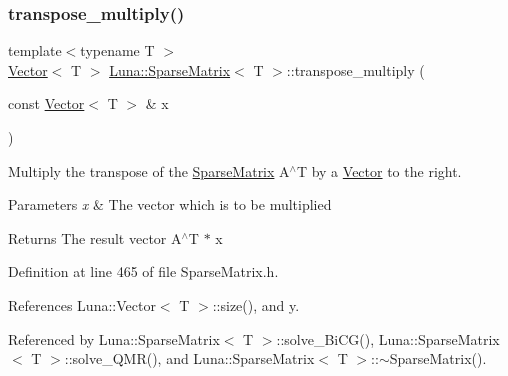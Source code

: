 \subsubsection{\texorpdfstring{transpose\+\_\+multiply()}{transpose\_multiply()}}
{\footnotesize\ttfamily template$<$typename T $>$ \\
\hyperlink{classLuna_1_1Vector}{Vector}$<$ T $>$ \hyperlink{classLuna_1_1SparseMatrix}{Luna\+::\+Sparse\+Matrix}$<$ T $>$\+::transpose\+\_\+multiply (\begin{DoxyParamCaption}\item[{const \hyperlink{classLuna_1_1Vector}{Vector}$<$ T $>$ \&}]{x }\end{DoxyParamCaption})\hspace{0.3cm}{\ttfamily [inline]}}



Multiply the transpose of the \hyperlink{classLuna_1_1SparseMatrix}{Sparse\+Matrix} A$^\wedge$T by a \hyperlink{classLuna_1_1Vector}{Vector} to the right. 


\begin{DoxyParams}{Parameters}
{\em x} & The vector which is to be multiplied \\
\hline
\end{DoxyParams}
\begin{DoxyReturn}{Returns}
The result vector A$^\wedge$T $\ast$ x 
\end{DoxyReturn}


Definition at line 465 of file Sparse\+Matrix.\+h.



References Luna\+::\+Vector$<$ T $>$\+::size(), and y.



Referenced by Luna\+::\+Sparse\+Matrix$<$ T $>$\+::solve\+\_\+\+Bi\+C\+G(), Luna\+::\+Sparse\+Matrix$<$ T $>$\+::solve\+\_\+\+Q\+M\+R(), and Luna\+::\+Sparse\+Matrix$<$ T $>$\+::$\sim$\+Sparse\+Matrix().



